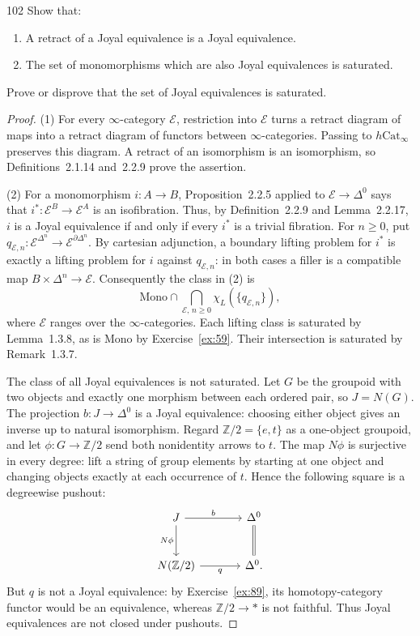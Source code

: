 \begin{exercise}{102}
Show that:
\begin{enumerate}[label=(\arabic*)]
 \item A retract of a Joyal equivalence is a Joyal equivalence.
 \item The set of monomorphisms which are also Joyal equivalences is saturated.
\end{enumerate}
Prove or disprove that the set of Joyal equivalences is saturated.

\begin{proof}
(1) For every $\infty$-category $\mathcal E$, restriction into $\mathcal E$
turns a retract diagram of maps into a retract diagram of functors
between $\infty$-categories. Passing to $h\mathrm{Cat}_\infty$ preserves
this diagram. A retract of an isomorphism is an isomorphism, so
Definitions~2.1.14 and~2.2.9 prove the assertion.

(2) For a monomorphism $i\colon A\to B$, Proposition~2.2.5 applied to
$\mathcal E\to\Delta^0$ says that
$i^*\colon\mathcal E^B\to\mathcal E^A$ is an isofibration.
Thus, by Definition~2.2.9 and Lemma~2.2.17, $i$ is a Joyal
equivalence if and only if every $i^*$ is a trivial fibration.
For $n\ge0$, put
$q_{\mathcal E,n}\colon\mathcal E^{\Delta^n}\to
\mathcal E^{\partial\Delta^n}$.
By cartesian adjunction, a boundary lifting problem for $i^*$ is
exactly a lifting problem for $i$ against $q_{\mathcal E,n}$:
in both cases a filler is a compatible map $B\times\Delta^n\to\mathcal E$.
Consequently the class in (2) is
\[
 \mathrm{Mono}\cap
 \bigcap_{\mathcal E,\,n\ge0}\chi_L(\{q_{\mathcal E,n}\}),
\]
where $\mathcal E$ ranges over the $\infty$-categories.
Each lifting class is saturated by Lemma~1.3.8, as is
$\mathrm{Mono}$ by Exercise~\ref{ex:59}.
Their intersection is saturated by Remark~1.3.7.

The class of all Joyal equivalences is not saturated.
Let $G$ be the groupoid with two objects and exactly one morphism
between each ordered pair, so $J=N(G)$.
The projection $b\colon J\to\Delta^0$ is a Joyal equivalence:
choosing either object gives an inverse up to natural isomorphism.
Regard $\mathbb Z/2=\{e,t\}$ as a one-object groupoid, and let
$\phi\colon G\to\mathbb Z/2$ send both nonidentity arrows to $t$.
The map $N\phi$ is surjective in every degree: lift a string of group
elements by starting at one object and changing objects exactly at
each occurrence of $t$.
Hence the following square is a degreewise pushout:
\[
\begin{tikzcd}[column sep=large,row sep=large]
 J\arrow[r,"b"]\arrow[d,"N\phi"'] & \Delta^0\arrow[d,equal] \\
 N(\mathbb Z/2)\arrow[r,"q"'] & \Delta^0.
\end{tikzcd}
\]
But $q$ is not a Joyal equivalence: by Exercise~\ref{ex:89}, its
homotopy-category functor would be an equivalence, whereas
$\mathbb Z/2\to *$ is not faithful.
Thus Joyal equivalences are not closed under pushouts.
\end{proof}
\end{exercise}
